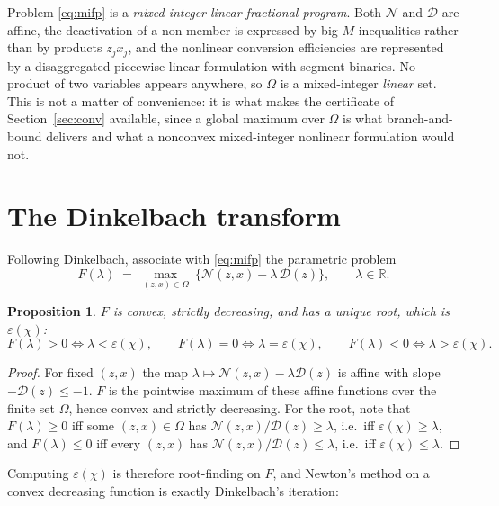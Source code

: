 \documentclass[11pt]{article}
\newcommand{\R}{\mathbb{R}}
\newtheorem{proposition}{Proposition}
\theoremstyle{remark}
\begin{document}
Problem \eqref{eq:mifp} is a \emph{mixed-integer linear fractional program}. Both
$\mathcal{N}$ and $\mathcal{D}$ are affine, the deactivation of a non-member is expressed by
big-$M$ inequalities rather than by products $z_j x_j$, and the nonlinear conversion
efficiencies are represented by a disaggregated piecewise-linear formulation with segment
binaries. No product of two variables appears anywhere, so $\Omega$ is a mixed-integer
\emph{linear} set. This is not a matter of convenience: it is what makes the certificate of
Section~\ref{sec:conv} available, since a global maximum over $\Omega$ is what
branch-and-bound delivers and what a nonconvex mixed-integer nonlinear formulation would not.

\section{The Dinkelbach transform}

Following Dinkelbach, associate with \eqref{eq:mifp} the parametric problem
\begin{equation}
F(\lambda)\;=\;\max_{(z,x)\in\Omega}\ \Big\{\mathcal{N}(z,x)-\lambda\,\mathcal{D}(z)\Big\},
\qquad \lambda\in\R .
\label{eq:Flambda}
\end{equation}

\begin{proposition}\label{prop:F}
$F$ is convex, strictly decreasing, and has a unique root, which is $\varepsilon(\chi)$:
\[
F(\lambda)>0\iff\lambda<\varepsilon(\chi),\qquad
F(\lambda)=0\iff\lambda=\varepsilon(\chi),\qquad
F(\lambda)<0\iff\lambda>\varepsilon(\chi).
\]
\end{proposition}

\begin{proof}
For fixed $(z,x)$ the map $\lambda\mapsto\mathcal{N}(z,x)-\lambda\mathcal{D}(z)$ is affine
with slope $-\mathcal{D}(z)\le-1$. $F$ is the pointwise maximum of these affine functions
over the finite set $\Omega$, hence convex and strictly decreasing. For the root, note that
$F(\lambda)\ge 0$ iff some $(z,x)\in\Omega$ has
$\mathcal{N}(z,x)/\mathcal{D}(z)\ge\lambda$, i.e.\ iff $\varepsilon(\chi)\ge\lambda$, and
$F(\lambda)\le 0$ iff every $(z,x)$ has
$\mathcal{N}(z,x)/\mathcal{D}(z)\le\lambda$, i.e.\ iff $\varepsilon(\chi)\le\lambda$.
\end{proof}

Computing $\varepsilon(\chi)$ is therefore root-finding on $F$, and Newton's method on a
convex decreasing function is exactly Dinkelbach's iteration:
\end{document}
